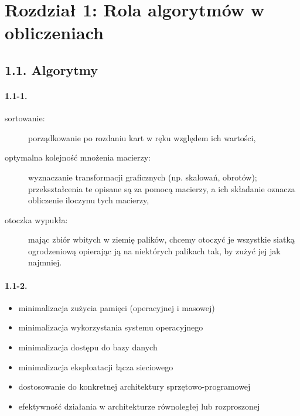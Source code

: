 \section*{Rozdział 1: Rola algorytmów w obliczeniach}

\subsection*{1.1. Algorytmy}

\paragraph{1.1-1.}
\begin{description}
	\item[sortowanie:] porządkowanie po rozdaniu kart w ręku względem ich wartości,
	\item[optymalna kolejność mnożenia macierzy:] wyznaczanie transformacji graficznych (np. skalowań, obrotów); przekształcenia te opisane są za pomocą macierzy, a ich składanie oznacza obliczenie iloczynu tych macierzy,
	\item[otoczka wypukła:] mając zbiór wbitych w ziemię palików, chcemy otoczyć je wszystkie siatką ogrodzeniową opierając ją na niektórych palikach tak, by zużyć jej jak najmniej.
\end{description}

\paragraph{1.1-2.}
\begin{itemize}
  \item minimalizacja zużycia pamięci (operacyjnej i masowej)
  \item minimalizacja wykorzystania systemu operacyjnego
  \item minimalizacja dostępu do bazy danych
  \item minimalizacja eksploatacji łącza sieciowego
  \item dostosowanie do konkretnej architektury sprzętowo-programowej
  \item efektywność działania w architekturze równoległej lub rozproszonej
\end{itemize}

